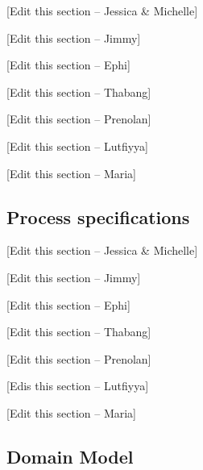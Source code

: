 \documentclass[11pt]{article}
\begin{document}
{\raggedright
[Edit this section -- Jessica \& Michelle]
}

{\raggedright
[Edit this section -- Jimmy]
}

{\raggedright
[Edit this section -- Ephi]
}

{\raggedright
[Edit this section -- Thabang]
}

{\raggedright
[Edit this section -- Prenolan]
}

{\raggedright
[Edit this section -- Lutfiyya]
}

{\raggedright
[Edit this section -- Maria]
}

{\raggedright
\subsection{Process specifications}
}

{\raggedright
[Edit this section -- Jessica \& Michelle]
}

{\raggedright
[Edit this section -- Jimmy]
}

{\raggedright
[Edit this section -- Ephi]
}

{\raggedright
[Edit this section -- Thabang]
}

{\raggedright
[Edit this section -- Prenolan]
}

{\raggedright
[Edis this section -- Lutfiyya]
}

{\raggedright
[Edit this section -- Maria]
}

{\raggedright
\subsection{Domain Model}
}
\end{document}
